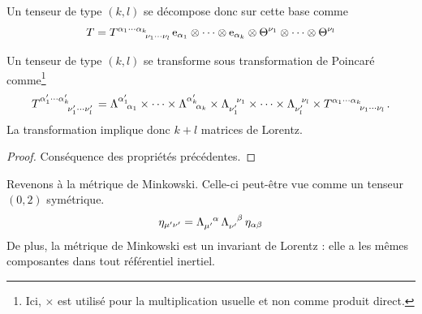 Un tenseur de type $(k,l)$ se décompose donc sur cette base comme
\begin{equation}
    T = T\indices{^{\alpha _1 \cdots \alpha _k}_{\nu_1 \cdots \nu_l}}\mathrm{e}_{\alpha_1} \otimes \cdots \otimes \mathrm{e}_{\alpha_k} \otimes \Theta^{\nu_1}\otimes \cdots \otimes \Theta^{\nu_l}
\end{equation}
\begin{theoremframe}
    \begin{propri}
        Un tenseur de type $(k,l)$ se transforme sous transformation de Poincaré comme\footnote{Ici, $\times$ est utilisé pour la multiplication usuelle et non comme produit direct.}
        \begin{equation}
            T\indices{^{{\alpha}_1' \cdots {\alpha}_k'}_{{\nu_1'} \cdots {\nu_l'}}} = \Lambda\indices{^{\alpha_1'}_{\!\alpha _1 }} \times \cdots \times \Lambda\indices{^{\alpha_k'}_{\!\alpha_k}} \times \Lambda\indices{_{\nu_1' }^{\!\nu_1 }} \times \cdots \times \Lambda\indices{_{\nu_l'}^{\!\nu_l}} \times T\indices{^{\alpha _1 \cdots \alpha _k}_{\nu_1 \cdots \nu_l}}.
        \end{equation}
        La transformation implique donc $k+l$ matrices de Lorentz.
    \end{propri}
\end{theoremframe}
\begin{proof}
    Conséquence des propriétés précédentes.
\end{proof}

Revenons à la métrique de Minkowski. Celle-ci peut-être vue comme un tenseur $(0,2)$ symétrique.
{
\renewcommand\indexmarker{\cdot}
\begin{equation*}
    \eta_{\mu'\nu'} = \Lambda\indices{_{\mu'}^{\alpha}}\, \Lambda\indices{_{\nu'}^{\beta}}\,\eta_{\alpha \beta}
\end{equation*}
}
De plus, la métrique de Minkowski est un invariant de Lorentz : elle a les mêmes composantes dans tout référentiel inertiel.


